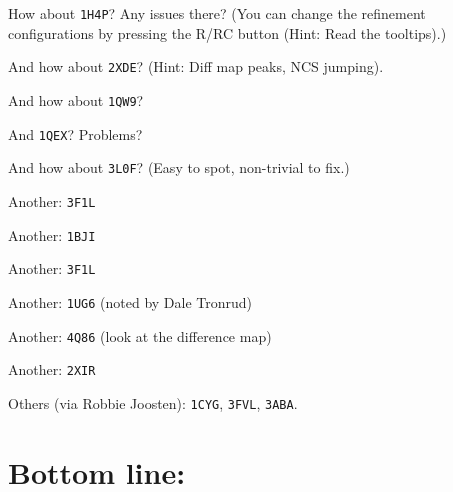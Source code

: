\documentclass{article}
\begin{document}
How about \texttt{1H4P}?  Any issues there?  (You can change the
refinement configurations by pressing the R/RC button (Hint: Read the tooltips).)


And how about \texttt{2XDE}? %
(Hint: Diff map peaks, NCS jumping).

And how about \texttt{1QW9}?

And \texttt{1QEX}?  Problems?

And how about \texttt{3L0F}? (Easy to spot, non-trivial to
fix.) %

Another: \texttt{3F1L}


Another: \texttt{1BJI}



Another: \texttt{3F1L}

Another: \texttt{1UG6} (noted by Dale Tronrud)

Another: \texttt{4Q86} (look at the difference map)

Another: \texttt{2XIR}


%   


Others (via Robbie Joosten): \texttt{1CYG}, \texttt{3FVL}, \texttt{3ABA}.





\section*{Bottom line:}
\end{document}
